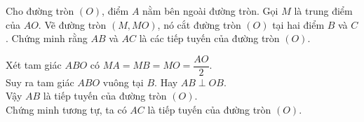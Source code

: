 \begin{vd}
Cho đường tròn $(O)$, điểm $A$ nằm bên ngoài đường tròn. Gọi $M$ là trung điểm của $AO$. Vẽ đường tròn $(M,MO)$, nó cắt đường tròn $(O)$ tại hai điểm $B$ và $C$. Chứng minh rằng $AB$ và $AC$ là các tiếp tuyến của đường tròn $(O)$.	
\loigiai
{
\immini
{
Xét tam giác $ABO$ có 
$MA=MB=MO=\dfrac{AO}{2}.$\\
Suy ra tam giác $ABO$ vuông tại $B$. Hay $AB \perp OB$.\\
Vậy $AB$ là tiếp tuyến của đường tròn $(O).$\\
Chứng minh tương tự, ta có $AC$ là tiếp tuyến của đường tròn $(O).$
}
{
}
}
\end{vd}

